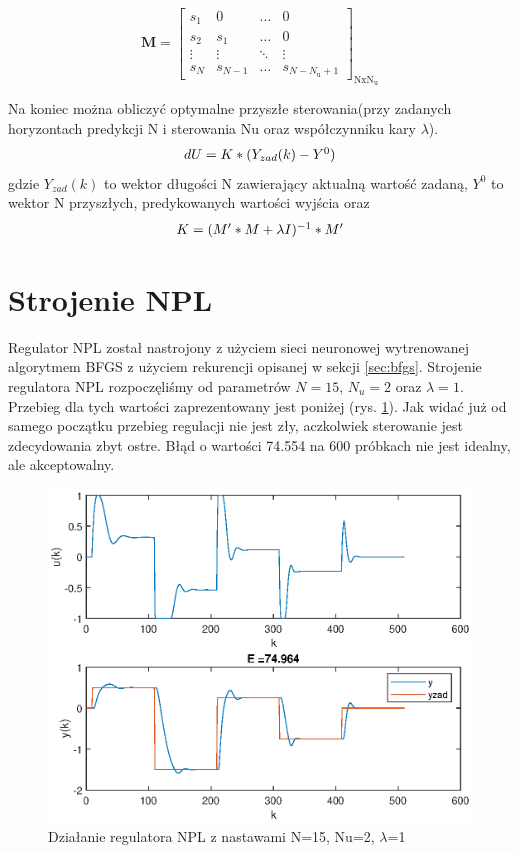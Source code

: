 		\begin{equation}
		\boldsymbol{M}=\left[
		\begin{array}
		{cccc}
		s_{1} & 0 & \ldots & 0\\
		s_{2} & s_{1} & \ldots & 0\\
		\vdots & \vdots & \ddots & \vdots\\
		s_{N} & s_{N-1} & \ldots &  s_{N-N_{\mathrm{u}}+1}
		\end{array}
		\right]_{\mathrm{NxN_u}}
		\label{Mm}
		\end{equation}
		
		Na koniec można obliczyć optymalne przyszłe sterowania(przy zadanych horyzontach predykcji N i sterowania Nu oraz współczynniku kary $\lambda$). 
		\begin{equation}
		\begin{tabular}{l}
		$dU=K*(Y_{zad}(k)-Y^0)$
		\end{tabular}
		\label{eq:NPL_du}
		\end{equation}
		gdzie $Y_{zad}(k)$ to wektor długości N zawierający aktualną wartość zadaną, $Y^0$ to wektor N przyszłych, predykowanych wartości wyjścia oraz
		\begin{equation}
		\begin{tabular}{l}
		$K=(M'*M+\lambda I)^{-1}*M'$
		\end{tabular}
		\label{eq:NPL_K}
		\end{equation}
	
		
		
	\section{Strojenie NPL}
		\label{sec:stroj_NPL}
		Regulator NPL został nastrojony z użyciem sieci neuronowej wytrenowanej algorytmem BFGS z użyciem rekurencji opisanej w sekcji \ref{sec:bfgs}. Strojenie regulatora NPL rozpoczęliśmy od parametrów $N=15$, $N_u=2$ oraz $\lambda=1$. Przebieg dla tych wartości zaprezentowany jest poniżej (rys. \ref{fig:NPL0}). Jak widać już od samego początku przebieg regulacji nie jest zły, aczkolwiek sterowanie jest zdecydowania zbyt ostre. Błąd o wartości 74.554 na 600 próbkach nie jest idealny, ale akceptowalny.
		
		\begin{figure}[h!]
			\centering
			\includegraphics[width=0.7\linewidth]{img/strojenieNPL_N_15_Nu_2_lam_1.eps}
			\caption{Działanie regulatora NPL z nastawami N=15, Nu=2, $\lambda$=1}
			\label{fig:NPL0}
		\end{figure}
		
